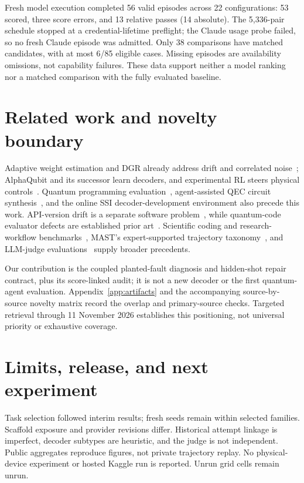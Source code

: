 \documentclass{article}
\begin{document}
Fresh model execution completed 56 valid episodes across 22 configurations: 53 scored, three score errors, and 13 relative passes (14 absolute). The 5,336-pair schedule stopped at a credential-lifetime preflight; the Claude usage probe failed, so no fresh Claude episode was admitted. Only 38 comparisons have matched candidates, with at most 6/85 eligible cases. Missing episodes are availability omissions, not capability failures. These data support neither a model ranking nor a matched comparison with the fully evaluated baseline.

\section{Related work and novelty boundary}
Adaptive weight estimation and DGR already address drift and correlated noise~\citep{spitz,dgr}; AlphaQubit and its successor learn decoders, and experimental RL steers physical controls~\citep{alpha,alpha2,rl}. Quantum programming evaluation~\citep{qcoder,quanbench}, agent-assisted QEC circuit synthesis~\citep{stabilizer}, and the online SSI decoder-development environment also precede this work. API-version drift is a separate software problem~\citep{apidrift}, while quantum-code evaluator defects are established prior art~\citep{quantumaudit}. Scientific coding and research-workflow benchmarks~\citep{scicode,scienceagent,mle,paperbench,scigym,sciarena}, MAST's expert-supported trajectory taxonomy~\citep{mast}, and LLM-judge evaluations~\citep{judge} supply broader precedents.

Our contribution is the coupled planted-fault diagnosis and hidden-shot repair contract, plus its score-linked audit; it is not a new decoder or the first quantum-agent evaluation. Appendix~\ref{app:artifacts} and the accompanying source-by-source novelty matrix record the overlap and primary-source checks. Targeted retrieval through 11 November 2026 establishes this positioning, not universal priority or exhaustive coverage.

\section{Limits, release, and next experiment}
Task selection followed interim results; fresh seeds remain within selected families. Scaffold exposure and provider revisions differ. Historical attempt linkage is imperfect, decoder subtypes are heuristic, and the judge is not independent. Public aggregates reproduce figures, not private trajectory replay. No physical-device experiment or hosted Kaggle run is reported. Unrun grid cells remain unrun.
\end{document}
